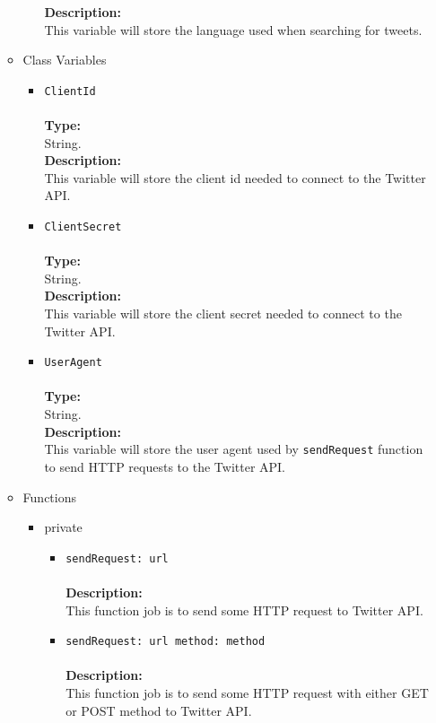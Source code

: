 \begin{itemize}
\begin{itemize}
\begin{itemize}
     \textbf{Description:}\\
     This variable will store the language used when searching for tweets.
\end{itemize}


\item Class Variables
\label{sec-1-4-1-3-2}%
\begin{itemize}
\item \verb~ClientId~\\\\
\textbf{Type:}\\
     String.\\

     \textbf{Description:}\\
     This variable will store the client id needed to connect to the Twitter API.
\item \verb~ClientSecret~\\\\
\textbf{Type:}\\
     String.\\

     \textbf{Description:}\\
     This variable will store the client secret needed to connect to the Twitter API.
\item \verb~UserAgent~\\\\
\textbf{Type:}\\
     String.\\

     \textbf{Description:}\\
     This variable will store the user agent used by \verb~sendRequest~ function to send HTTP requests to the Twitter API.
\end{itemize}


\item Functions
\label{sec-1-4-1-3-3}%
\begin{itemize}

\item private
\label{sec-1-4-1-3-3-1}%
\begin{itemize}
\item \verb~sendRequest: url~\\\\
\textbf{Description:}\\
      This function job is to send some HTTP request to Twitter API.\\
\item \verb~sendRequest: url method: method~\\\\
\textbf{Description:}\\
      This function job is to send some HTTP request with either GET or POST method to Twitter API.\\
\end{itemize}



\end{itemize}
\end{itemize}
\end{itemize}
